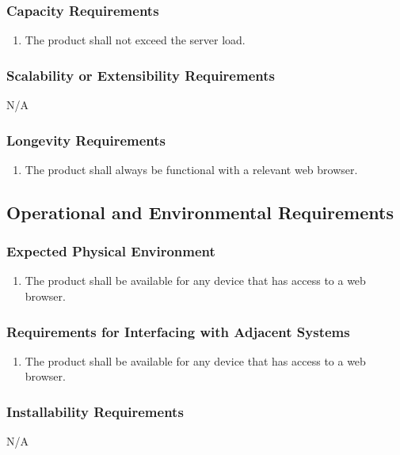 \documentclass[12pt, titlepage]{article}
\begin{document}
\subsubsection{Capacity Requirements}
\begin{enumerate}
    \item The product shall not exceed the server load.
\end{enumerate}

\subsubsection{Scalability or Extensibility Requirements}
N/A

\subsubsection{Longevity Requirements}
\begin{enumerate}
    \item The product shall always be functional with a relevant web browser.
\end{enumerate}

\subsection{Operational and Environmental Requirements}

\subsubsection{Expected Physical Environment}
\begin{enumerate}
    \item The product shall be available for any device that has access to a web browser.
\end{enumerate}

\subsubsection{Requirements for Interfacing with Adjacent Systems}
\begin{enumerate}
    \item The product shall be available for any device that has access to a web browser. 
\end{enumerate}

\subsubsection{Installability Requirements}
N/A
\end{document}
